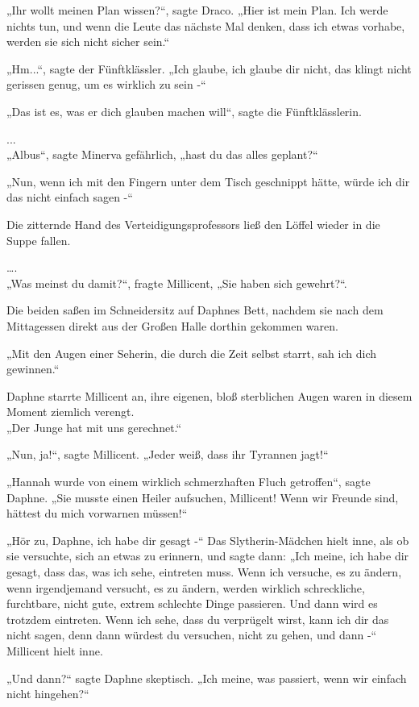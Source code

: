 {„Ihr wollt meinen Plan wissen?“, sagte Draco. „Hier ist mein Plan. Ich werde nichts tun, und wenn die Leute das nächste Mal denken, dass ich etwas vorhabe, werden sie sich nicht sicher sein.“

„Hm...“, sagte der Fünftklässler. „Ich glaube, ich glaube dir nicht, das klingt nicht gerissen genug, um es wirklich zu sein -“

„Das ist es, was er dich glauben machen will“, sagte die Fünftklässlerin.

...\\ „Albus“, sagte Minerva gefährlich, „hast du das alles geplant?“

„Nun, wenn ich mit den Fingern unter dem Tisch geschnippt hätte, würde ich dir das nicht einfach sagen -“

Die zitternde Hand des Verteidigungsprofessors ließ den Löffel wieder in die Suppe fallen.

….\\ „Was meinst du damit?“, fragte Millicent, „Sie haben sich gewehrt?“.

Die beiden saßen im Schneidersitz auf Daphnes Bett, nachdem sie nach dem Mittagessen direkt aus der Großen Halle dorthin gekommen waren.

„Mit den Augen einer Seherin, die durch die Zeit selbst starrt, sah ich dich gewinnen.“

Daphne starrte Millicent an, ihre eigenen, bloß sterblichen Augen waren in diesem Moment ziemlich verengt.\\ „Der Junge hat mit uns gerechnet.“

„Nun, ja!“, sagte Millicent. „Jeder weiß, dass ihr Tyrannen jagt!“

„Hannah wurde von einem wirklich schmerzhaften Fluch getroffen“, sagte Daphne. „Sie musste einen Heiler aufsuchen, Millicent! Wenn wir Freunde sind, hättest du mich vorwarnen müssen!“

„Hör zu, Daphne, ich habe dir gesagt -“ Das Slytherin-Mädchen hielt inne, als ob sie versuchte, sich an etwas zu erinnern, und sagte dann: „Ich meine, ich habe dir gesagt, dass das, was ich sehe, eintreten muss. Wenn ich versuche, es zu ändern, wenn irgendjemand versucht, es zu ändern, werden wirklich schreckliche, furchtbare, nicht gute, extrem schlechte Dinge passieren. Und dann wird es trotzdem eintreten. Wenn ich sehe, dass du verprügelt wirst, kann ich dir das nicht sagen, denn dann würdest du versuchen, nicht zu gehen, und dann -“ Millicent hielt inne.

„Und dann?“ sagte Daphne skeptisch. „Ich meine, was passiert, wenn wir einfach nicht hingehen?“

}
